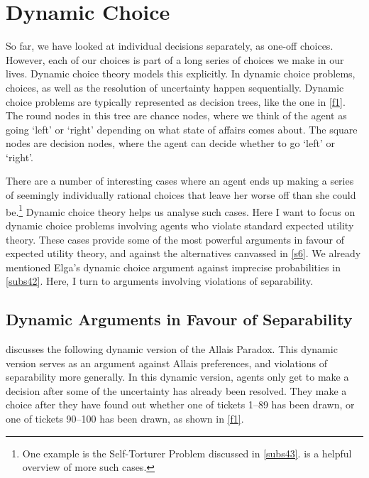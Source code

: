 \section{Dynamic Choice}\label{s7}

So far, we have looked at individual decisions separately, as one-off choices. However, each of our choices is part of a long series of choices we make in our lives. Dynamic choice theory models this explicitly. In dynamic choice problems, choices, as well as the resolution of uncertainty happen sequentially. Dynamic choice problems are typically represented as decision trees, like the one in \autoref{f1}. The round nodes in this tree are chance nodes, where we think of the agent as going `left' or `right' depending on what state of affairs comes about. The square nodes are decision nodes, where the agent can decide whether to go `left' or `right'.

There are a number of interesting cases where an agent ends up making a series of seemingly individually rational choices that leave her worse off than she could be.\footnote{One example is the Self-Torturer Problem discussed in \autoref{subs43}. \citet{Andreou2012} is a helpful overview of more such cases.} Dynamic choice theory helps us analyse such cases. Here I want to focus on dynamic choice problems involving agents who violate standard expected utility theory. These cases provide some of the most powerful arguments in favour of expected utility theory, and against the alternatives canvassed in \autoref{s6}. We already mentioned Elga's dynamic choice argument against imprecise probabilities in \autoref{subs42}. Here, I turn to arguments involving violations of separability.

\subsection{Dynamic Arguments in Favour of Separability}\label{subs71}

\citet{Machina1989} discusses the following dynamic version of the Allais Paradox. This dynamic version serves as an argument against Allais preferences, and violations of separability more generally. In this dynamic version, agents only get to make a decision after some of the uncertainty has already been resolved. They make a choice after they have found out whether one of tickets 1--89 has been drawn, or one of tickets 90--100 has been drawn, as shown in \autoref{f1}.

